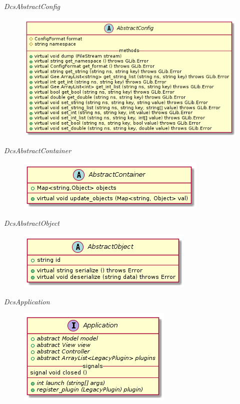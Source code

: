       \emph{DcsAbstractConfig}

        \begin{figure}[H]
          \includegraphics{figures/design/class/core/abstract-config}
        \end{figure}

      \emph{DcsAbstractContainer}

        \begin{figure}[H]
          \includegraphics{figures/design/class/core/abstract-container}
        \end{figure}

      \emph{DcsAbstractObject}

        \begin{figure}[H]
          \includegraphics{figures/design/class/core/abstract-object}
        \end{figure}

      \emph{DcsApplication}

        \begin{figure}[H]
          \includegraphics{figures/design/class/core/application}
        \end{figure}

